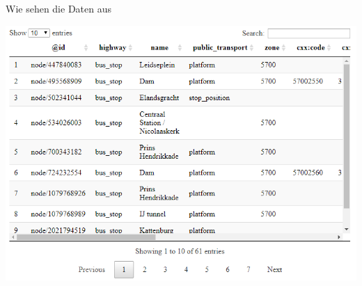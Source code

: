 \documentclass[ignorenonframetext,]{beamer}
\newenvironment{Shaded}{\begin{snugshade}}{\end{snugshade}}
\newcommand{\KeywordTok}[1]{\textcolor[rgb]{0.13,0.29,0.53}{\textbf{#1}}}
\newcommand{\NormalTok}[1]{#1}
\newcommand{\OperatorTok}[1]{\textcolor[rgb]{0.81,0.36,0.00}{\textbf{#1}}}
\begin{document}
\begin{frame}[fragile]{Wie sehen die Daten aus}
\protect\hypertarget{wie-sehen-die-daten-aus}{}

\begin{Shaded}
\end{Shaded}

\includegraphics{figure/amsterdam_busstop_features.PNG}

\end{frame}
\end{document}
